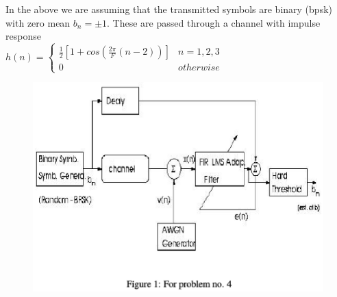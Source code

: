 \documentclass[journal,12pt,twocolumn]{IEEEtran}
\begin{document}
\begin{enumerate}
\bigskip
\bigskip
In the above we are assuming that the transmitted symbols are binary (bpsk) with zero mean $b_n=\pm 1$. These are passed through a channel with impulse response\\
\medskip
$h(n)=\begin{cases}
\frac{1}{2}[1+cos(\frac{2\pi}{F}{(n-2)})]& n=1,2,3\\
0 & otherwise
\end{cases}$\\
\medskip
\begin{center}
\begin{figure}
\centering
\includegraphics[width=\columnwidth]{./figs/figure3.eps}
\caption{}
\label{fig:figure3}
\end{figure}


\end{center}
\end{enumerate}
\end{document}
